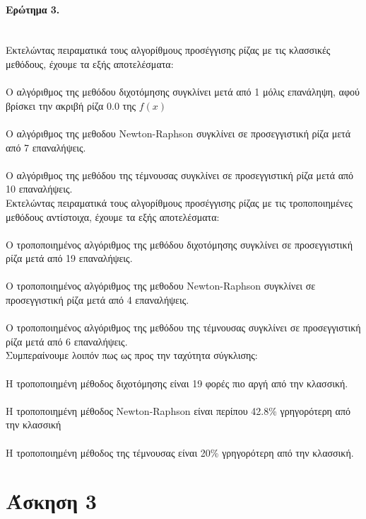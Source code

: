 \documentclass[a4paper,11pt]{article}
\newcommand{\lt}{\latintext}
\begin{document}
\paragraph{Ερώτημα 3.}\mbox{}\\
Εκτελώντας πειραματικά τους αλγορίθμους προσέγγισης ρίζας με τις κλασσικές μεθόδους, έχουμε τα εξής αποτελέσματα:\\
\\ Ο αλγόριθμος της μεθόδου διχοτόμησης συγκλίνει μετά από 1 μόλις επανάληψη, αφού βρίσκει την ακριβή ρίζα 0.0 της {\lt $f(x)$}\\
\\ Ο αλγόριθμος της μεθοδου {\lt Newton-Raphson} συγκλίνει σε προσεγγιστική ρίζα μετά από 7 επαναλήψεις.\\
\\ Ο αλγόριθμος της μεθόδου της τέμνουσας συγκλίνει σε προσεγγιστική ρίζα μετά από 10 επαναλήψεις.\\

Εκτελώντας πειραματικά τους αλγορίθμους προσέγγισης ρίζας με τις τροποποιημένες μεθόδους αντίστοιχα, έχουμε τα εξής αποτελέσματα:\\
\\ Ο τροποποιημένος αλγόριθμος της μεθόδου διχοτόμησης συγκλίνει σε προσεγγιστική ρίζα μετά από 19 επαναλήψεις.\\
\\ Ο τροποποιημένος αλγόριθμος της μεθοδου {\lt Newton-Raphson} συγκλίνει σε προσεγγιστική ρίζα μετά από 4 επαναλήψεις.\\
\\ Ο τροποποιημένος αλγόριθμος της μεθόδου της τέμνουσας συγκλίνει σε προσεγγιστική ρίζα μετά από 6 επαναλήψεις.\\

Συμπεραίνουμε λοιπόν πως ως προς την ταχύτητα σύγκλισης:\\
\\Η τροποποιημένη μέθοδος διχοτόμησης είναι 19 φορές πιο αργή από την κλασσική.\\
\\Η τροποποιημένη μέθοδος {\lt Newton-Raphson} είναι περίπου 42.8\% γρηγορότερη από την κλασσική\\
\\Η τροποποιημένη μέθοδος της τέμνουσας είναι 20\% γρηγορότερη από την κλασσική.\\

\section*{Άσκηση 3}
\end{document}
